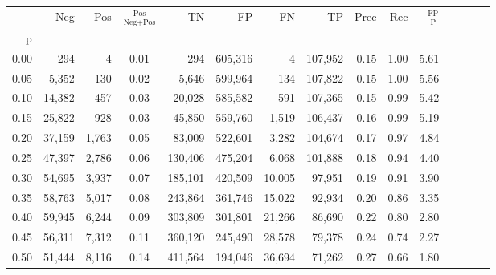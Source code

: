 \begin{tabular}{rrrcrrrrrrrrrrr}
\toprule
{} &     Neg &    Pos & $\frac{\text{Pos}}{\text{Neg}+\text{Pos}}$ &       TN &       FP &       FN &       TP &  Prec &   Rec & $\frac{\text{FP}}{\text{P}}$ \\
p    &         &        &                                            &          &          &          &          &       &       &                              \\
\midrule
0.00 &     294 &      4 &                                       0.01 &      294 &  605,316 &        4 &  107,952 &  0.15 &  1.00 &                         5.61 \\
0.05 &   5,352 &    130 &                                       0.02 &    5,646 &  599,964 &      134 &  107,822 &  0.15 &  1.00 &                         5.56 \\
0.10 &  14,382 &    457 &                                       0.03 &   20,028 &  585,582 &      591 &  107,365 &  0.15 &  0.99 &                         5.42 \\
0.15 &  25,822 &    928 &                                       0.03 &   45,850 &  559,760 &    1,519 &  106,437 &  0.16 &  0.99 &                         5.19 \\
0.20 &  37,159 &  1,763 &                                       0.05 &   83,009 &  522,601 &    3,282 &  104,674 &  0.17 &  0.97 &                         4.84 \\
0.25 &  47,397 &  2,786 &                                       0.06 &  130,406 &  475,204 &    6,068 &  101,888 &  0.18 &  0.94 &                         4.40 \\
0.30 &  54,695 &  3,937 &                                       0.07 &  185,101 &  420,509 &   10,005 &   97,951 &  0.19 &  0.91 &                         3.90 \\
0.35 &  58,763 &  5,017 &                                       0.08 &  243,864 &  361,746 &   15,022 &   92,934 &  0.20 &  0.86 &                         3.35 \\
0.40 &  59,945 &  6,244 &                                       0.09 &  303,809 &  301,801 &   21,266 &   86,690 &  0.22 &  0.80 &                         2.80 \\
0.45 &  56,311 &  7,312 &                                       0.11 &  360,120 &  245,490 &   28,578 &   79,378 &  0.24 &  0.74 &                         2.27 \\
0.50 &  51,444 &  8,116 &                                       0.14 &  411,564 &  194,046 &   36,694 &   71,262 &  0.27 &  0.66 &                         1.80 \\

\end{tabular}
